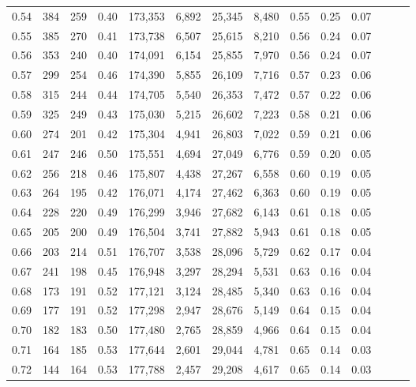 \begin{tabular}{rrrrrrrrrrrrrr}
0.54 &     384 &  259 &  0.40 &  173,353 &    6,892 &  25,345 &   8,480 &  0.55 &  0.25 &      0.07 \\
0.55 &     385 &  270 &  0.41 &  173,738 &    6,507 &  25,615 &   8,210 &  0.56 &  0.24 &      0.07 \\
0.56 &     353 &  240 &  0.40 &  174,091 &    6,154 &  25,855 &   7,970 &  0.56 &  0.24 &      0.07 \\
0.57 &     299 &  254 &  0.46 &  174,390 &    5,855 &  26,109 &   7,716 &  0.57 &  0.23 &      0.06 \\
0.58 &     315 &  244 &  0.44 &  174,705 &    5,540 &  26,353 &   7,472 &  0.57 &  0.22 &      0.06 \\
0.59 &     325 &  249 &  0.43 &  175,030 &    5,215 &  26,602 &   7,223 &  0.58 &  0.21 &      0.06 \\
0.60 &     274 &  201 &  0.42 &  175,304 &    4,941 &  26,803 &   7,022 &  0.59 &  0.21 &      0.06 \\
0.61 &     247 &  246 &  0.50 &  175,551 &    4,694 &  27,049 &   6,776 &  0.59 &  0.20 &      0.05 \\
0.62 &     256 &  218 &  0.46 &  175,807 &    4,438 &  27,267 &   6,558 &  0.60 &  0.19 &      0.05 \\
0.63 &     264 &  195 &  0.42 &  176,071 &    4,174 &  27,462 &   6,363 &  0.60 &  0.19 &      0.05 \\
0.64 &     228 &  220 &  0.49 &  176,299 &    3,946 &  27,682 &   6,143 &  0.61 &  0.18 &      0.05 \\
0.65 &     205 &  200 &  0.49 &  176,504 &    3,741 &  27,882 &   5,943 &  0.61 &  0.18 &      0.05 \\
0.66 &     203 &  214 &  0.51 &  176,707 &    3,538 &  28,096 &   5,729 &  0.62 &  0.17 &      0.04 \\
0.67 &     241 &  198 &  0.45 &  176,948 &    3,297 &  28,294 &   5,531 &  0.63 &  0.16 &      0.04 \\
0.68 &     173 &  191 &  0.52 &  177,121 &    3,124 &  28,485 &   5,340 &  0.63 &  0.16 &      0.04 \\
0.69 &     177 &  191 &  0.52 &  177,298 &    2,947 &  28,676 &   5,149 &  0.64 &  0.15 &      0.04 \\
0.70 &     182 &  183 &  0.50 &  177,480 &    2,765 &  28,859 &   4,966 &  0.64 &  0.15 &      0.04 \\
0.71 &     164 &  185 &  0.53 &  177,644 &    2,601 &  29,044 &   4,781 &  0.65 &  0.14 &      0.03 \\
0.72 &     144 &  164 &  0.53 &  177,788 &    2,457 &  29,208 &   4,617 &  0.65 &  0.14 &      0.03 \\

\end{tabular}
